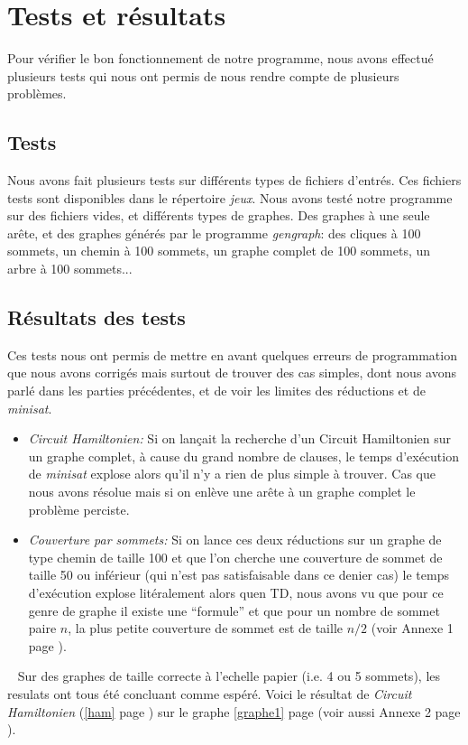  \section{Tests et résultats}
  Pour vérifier le bon fonctionnement de notre programme, nous avons
  effectué plusieurs tests qui nous ont permis de nous rendre compte de
  plusieurs problèmes.

  \subsection{Tests}
  Nous avons fait plusieurs tests sur différents types de fichiers
  d'entrés. Ces fichiers tests sont disponibles dans le répertoire
  \emph{jeux}. \newline
  \indent Nous avons testé notre programme sur des fichiers vides,
  et différents types de graphes. Des graphes à une seule arête, et des
  graphes générés par le programme \emph{gengraph}: des cliques à 100
  sommets, un chemin à 100 sommets, un graphe complet de 100 sommets, un
  arbre à 100 sommets...

  \subsection{Résultats des tests}
  Ces tests nous ont permis de mettre en avant quelques erreurs de
  programmation que nous avons corrigés mais surtout de trouver des cas
  simples, dont nous avons parlé dans les parties précédentes, et de
  voir les limites des réductions et de \emph{minisat}.\newline
  \begin{itemize}
   \item \emph{Circuit Hamiltonien:} Si on lançait la recherche d'un
	 Circuit Hamiltonien sur un graphe complet, à cause du grand
	 nombre de clauses, le temps d'exécution de \emph{minisat}
	 explose alors qu'il n'y a rien de plus simple à trouver. Cas
	 que nous avons résolue mais si on enlève une arête à un graphe
	 complet le problème perciste.\\
   \item \emph{Couverture par sommets:} Si on lance ces deux
	 réductions sur un graphe de type chemin de taille 100 et que
	 l'on cherche une couverture de sommet de taille 50 ou
	 inférieur (qui n'est pas satisfaisable dans ce denier cas) le
	 temps d'exécution explose litéralement alors quen TD, nous
	 avons vu que pour ce genre de graphe il existe une ``formule''
	 et que pour un nombre de sommet paire $n$, la plus petite
	 couverture de sommet est de taille $n/2$ (voir Annexe 1 page
	 \pageref{an1}). 
  \end{itemize}
  ~\newline
  \indent Sur des graphes de taille correcte à l'echelle papier (i.e. 4
  ou 5 sommets), les resulats ont tous été concluant comme espéré. Voici
  le résultat de \emph{Circuit Hamiltonien} (\ref{ham} page
  \pageref{ham}) sur le graphe \ref{graphe1} page \pageref{graphe1} (voir
  aussi Annexe 2 page \pageref{an2}). 


